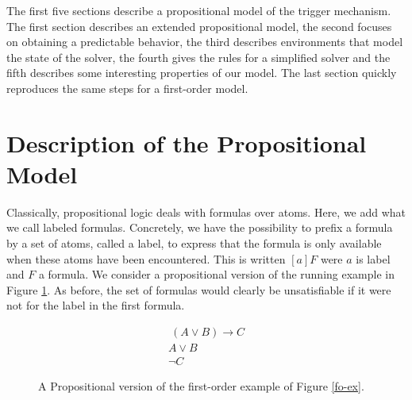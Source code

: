 \documentclass[a4paper,11pt]{article}
\begin{document}
The first five sections describe a propositional model of the trigger mechanism. The first section
describes an extended propositional model, the second focuses on obtaining a predictable behavior,
the third describes environments that model the state of the solver, the fourth gives the rules for a
simplified solver and the fifth describes some interesting properties of our model.
The last section quickly reproduces the same steps for a first-order model.
\section{Description of the Propositional Model}
Classically, propositional logic deals with formulas over atoms.
Here, we add what we call labeled formulas.
Concretely, we have the possibility to prefix a formula by a set of atoms, called a label, to express
that the formula is only available when these atoms have been encountered. This is written $[a]F$
were $a$ is label and $F$ a formula.
We consider a propositional version of the running example in Figure \ref{p-ex}. As before, the set
of formulas would clearly be unsatisfiable if it were not for the label in the first formula.

\begin{figure}
\begin{eqnarray*}
 [A]~(A\vee B)\rightarrow C\\
 A\vee B\\
 \neg C
\end{eqnarray*}
\caption{\label{p-ex}A Propositional version of the first-order example of Figure \ref{fo-ex}.}
\end{figure}
\end{document}
